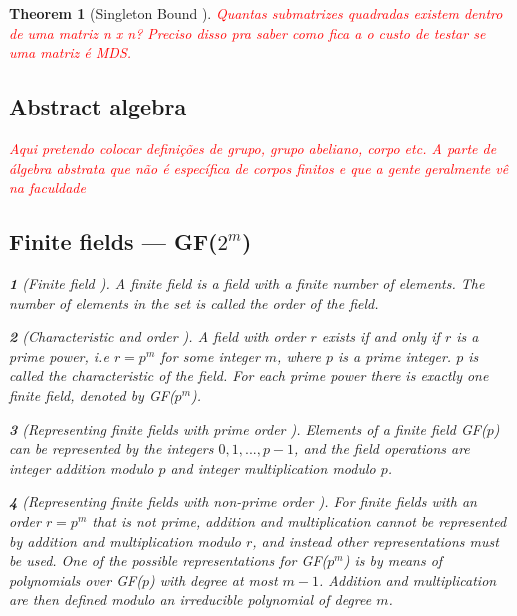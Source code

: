 \documentclass{report}
\newtheorem{theorem}{Theorem}{\bfseries}{\itshape}
\newtheorem*{concept}{}{\bfseries}{\itshape}
\begin{document}
\begin{theorem}[Singleton Bound \cite{SloaneBook}]
\textcolor{red}{Quantas submatrizes quadradas existem dentro de uma matriz n x n? Preciso disso pra saber como fica a o custo de testar se uma matriz é MDS.}

\subsection{Abstract algebra}
\textcolor{red}{Aqui pretendo colocar definições de grupo, grupo abeliano, corpo etc. A parte de álgebra abstrata que não é específica de corpos finitos e que a gente geralmente vê na faculdade}

\subsection{Finite fields --- GF($2^m$)}

\begin{concept}[Finite field \cite{DesignOfRijndael2002}]
A \emph{finite field} is a field with a finite number of elements. The number of elements in the set is called the \emph{order} of the field. 
\end{concept}

\begin{concept}[Characteristic and order \cite{DesignOfRijndael2002}]
A field with order $r$ exists if and only if $r$ is a prime power, i.e $r = p^m$ for some integer $m$, where $p$ is a prime integer. $p$ is called the \emph{characteristic} of the field. For each prime power there is exactly one finite field, denoted by GF($p^m$).
\end{concept}

\begin{concept}[Representing finite fields with prime order \cite{DesignOfRijndael2002}]
Elements of a finite field GF($p$) can be represented by the integers $0, 1, ..., p - 1$, and the field operations are integer addition modulo $p$ and integer multiplication modulo $p$.
\end{concept}

\begin{concept}[Representing finite fields with non-prime order \cite{DesignOfRijndael2002}]
For finite fields with an order $r = p^m$ that is not prime, addition and multiplication cannot be represented by addition and multiplication modulo $r$, and instead other representations must be used. One of the possible representations for GF($p^m$) is by means of \emph{polynomials over GF($p$) with degree at most $m-1$}. Addition and multiplication are then defined modulo an \emph{irreducible polynomial of degree $m$}.
\end{concept}


\end{theorem}
\end{document}
